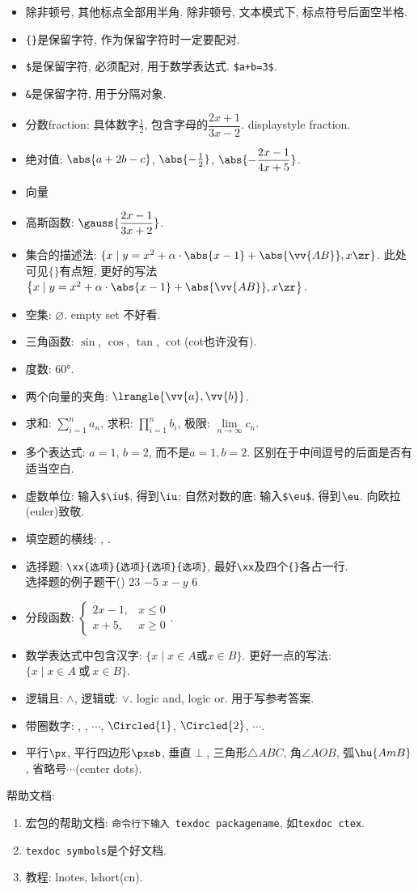 \begin{itemize}
\item 除非顿号, 其他标点全部用半角. 除非顿号, 文本模式下, 标点符号后面空半格. 
\item \verb|{}|是保留字符, 作为保留字符时一定要配对. 
\item \verb|$|是保留字符, 必须配对, 用于数学表达式. \verb|$a+b=3$|. 
\item \verb|&|是保留字符, 用于分隔对象. 
\item 分数fraction: 具体数字$\frac{1}{2}$, 包含字母的$\dfrac{2x+1}{3x-2}$. displaystyle fraction. 
\item 绝对值: $\abs{a+2b-c}$, $\abs{-\frac{1}{2}}$, $\abs{-\dfrac{2x-1}{4x+5}}$. 
\item 向量
\item 高斯函数: $\gauss{\dfrac{2x-1}{3x+2}}$. 
\item 集合的描述法: $\{x\mid y=x^2+\alpha\cdot\abs{x-1}+\abs{\vv{AB}}, x\zr\}$. 此处可见$\{\}$有点短, 更好的写法$\left\{x\mid y=x^2+\alpha\cdot\abs{x-1}+\abs{\vv{AB}}, x\zr\right\}$. 
\item 空集: $\varnothing$. empty set 不好看. 
\item 三角函数: $\sin$, $\cos$, $\tan$, $\cot$(cot也许没有). %
\item 度数: $\ang{60}$. 
\item 两个向量的夹角: $\lrangle{\vv{a},\vv{b}}$. 
\item 求和: $\sum\limits_{i=1}^{n} a_n$, 求积: $\prod\limits_{i=1}^n b_i$, 极限: $\lim\limits_{n\to\infty} c_n$. 
\item 多个表达式: $a=1$, $b=2$, 而不是$a=1,b=2$. 区别在于中间逗号的后面是否有适当空白. 
\item 虚数单位: 输入\verb|$\iu$|, 得到$\iu$; 自然对数的底: 输入\verb|$\eu$|, 得到$\eu$. 向欧拉(euler)致敬. 
\item 填空题的横线: , . 
\item 选择题: \verb|\xx{选项}{选项}{选项}{选项}|, 最好\verb|\xx|及四个\verb|{}|各占一行. \\
选择题的例子题干\dotfill()
\xx
{23}
{$-5$}
{$x-y$}
{6}
\item 分段函数: $\begin{cases}
2x-1, & x\leq 0\\
x+5, & x\geq 0
\end{cases}$. 
\item 数学表达式中包含汉字: $\{x\mid x\in A\text{或} x\in B\}$. 更好一点的写法: $\{x\mid x\in A~\text{或}~x\in B\}$. 
\item 逻辑且: $\land$, 逻辑或: $\lor$. logic and, logic or. 用于写参考答案. 
\item 带圈数字: , , $\cdots$, $\Circled{1}$, $\Circled{2}$, $\cdots$. 
\item 平行$\px$, 平行四边形$\pxsb$, 垂直$\perp$, 三角形$\triangle{ABC}$, 角$\angle{AOB}$, 弧$\hu{AmB}$, 省略号$\cdots$(center dots). 
\end{itemize}


帮助文档: 
\begin{enumerate}
\item 宏包的帮助文档: \verb|命令行下输入 texdoc packagename|, 如\verb|texdoc ctex|. 
\item \verb|texdoc symbols|是个好文档. 
\item 教程: lnotes, lshort(cn). 
\end{enumerate}
